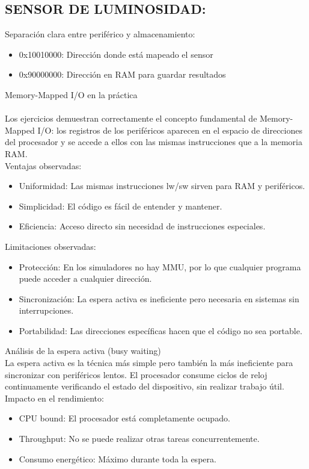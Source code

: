 \documentclass{article}
\begin{document}
\subsection{SENSOR DE LUMINOSIDAD:}
Separación clara entre periférico y almacenamiento:
\begin{itemize}
    \item 0x10010000: Dirección donde está mapeado el sensor

    \item 0x90000000: Dirección en RAM para guardar resultados
\end{itemize}
 Memory-Mapped I/O en la práctica
 \\
 \\Los ejercicios demuestran correctamente el concepto fundamental de Memory-Mapped I/O: los registros de los periféricos aparecen en el espacio de direcciones del procesador y se accede a ellos con las mismas instrucciones que a la memoria RAM.
 \\
 Ventajas observadas:
 \begin{itemize}
     \item Uniformidad: Las mismas instrucciones lw/sw sirven para RAM y periféricos.
     \item Simplicidad: El código es fácil de entender y mantener.
     \item Eficiencia: Acceso directo sin necesidad de instrucciones especiales.
 \end{itemize}
Limitaciones observadas:
\begin{itemize}
    \item Protección: En los simuladores no hay MMU, por lo que cualquier programa puede acceder a cualquier dirección.
    \item Sincronización: La espera activa es ineficiente pero necesaria en sistemas sin interrupciones.
    \item Portabilidad: Las direcciones específicas hacen que el código no sea portable.
\end{itemize}
Análisis de la espera activa (busy waiting)
\\
La espera activa es la técnica más simple pero también la más ineficiente para sincronizar con periféricos lentos. El procesador consume ciclos de reloj continuamente verificando el estado del dispositivo, sin realizar trabajo útil.
\\
Impacto en el rendimiento:
\begin{itemize}
    \item CPU bound: El procesador está completamente ocupado.
    \item Throughput: No se puede realizar otras tareas concurrentemente.
    \item Consumo energético: Máximo durante toda la espera.
\end{itemize}
\end{document}
